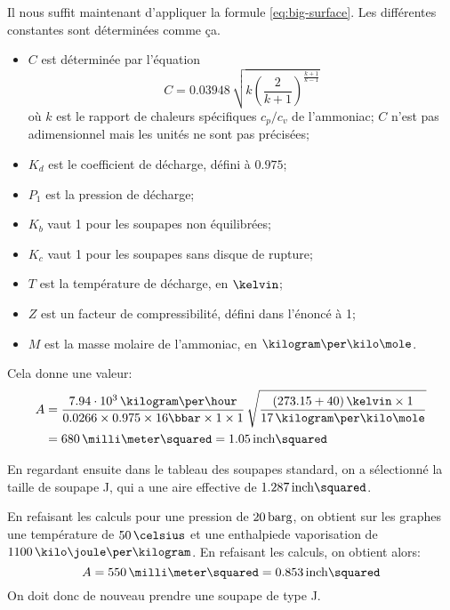 Il nous suffit maintenant d'appliquer la formule \eqref{eq:big-surface}.
Les différentes constantes sont déterminées comme ça.
\begin{itemize}
    \item $C$ est déterminée par l'équation
        \begin{equation}
            C = 0.03948\,\sqrt{k\left(\frac{2}{k+1}\right)^\frac{k+1}{k-1}}
        \end{equation}
        où $k$ est le rapport de chaleurs spécifiques $c_p/c_v$ de l'ammoniac;
        $C$ n'est pas adimensionnel mais les unités ne sont pas précisées;
    \item $K_d$ est le coefficient de décharge, défini à $0.975$;
    \item $P_1$ est la pression de décharge;
    \item $K_b$ vaut 1 pour les soupapes non équilibrées;
    \item $K_c$ vaut 1 pour les soupapes sans disque de rupture;
    \item $T$ est la température de décharge, en $\kelvin$;
    \item $Z$ est un facteur de compressibilité, défini dans l'énoncé à 1;
    \item $M$ est la masse molaire de l'ammoniac, en $\kilogram\per\kilo\mole$.
\end{itemize}
Cela donne une valeur:
\begin{equation*}
    \begin{aligned}
        A &= \frac{7.94\cdot10^3\,\kilogram\per\hour}
        {0.0266 \times 0.975 \times 16\bbar \times 1 \times 1}\,
        \sqrt{\frac{(273.15+40)\,\kelvin \times 1}{17\,\kilogram\per\kilo\mole}}
        \\
        &= 680\,\milli\meter\squared = 1.05\,\inch\squared
    \end{aligned}
\end{equation*}

En regardant ensuite dans le tableau des soupapes standard,
on a sélectionné la taille de soupape J, qui a une aire
effective de $1.287\,\inch\squared$.

En refaisant les calculs pour une pression de $20\,\mathrm{barg}$, on obtient sur
les graphes une température de $50\,\celsius$
et une enthalpiede vaporisation de $1100\,\kilo\joule\per\kilogram$.
En refaisant les calculs, on obtient alors:
\begin{equation*}
    A = 550\,\milli\meter\squared = 0.853\,\inch\squared
\end{equation*}
On doit donc de nouveau prendre une soupape de type J.

